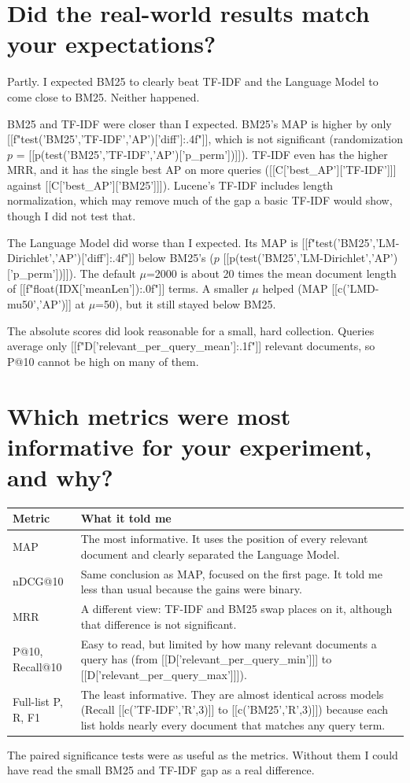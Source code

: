 \section{Did the real-world results match your expectations?}
Partly. I expected BM25 to clearly beat TF-IDF and the Language Model to come close to BM25. Neither happened.

BM25 and TF-IDF were closer than I expected. BM25's MAP is higher by only [[f"{test('BM25','TF-IDF','AP')['diff']:.4f}"]], which is not significant (randomization $p$ = [[p(test('BM25','TF-IDF','AP')['p_perm'])]]). TF-IDF even has the higher MRR, and it has the single best AP on more queries ([[C['best_AP']['TF-IDF']]] against [[C['best_AP']['BM25']]]). Lucene's TF-IDF includes length normalization, which may remove much of the gap a basic TF-IDF would show, though I did not test that.

The Language Model did worse than I expected. Its MAP is [[f"{test('BM25','LM-Dirichlet','AP')['diff']:.4f}"]] below BM25's ($p$ [[p(test('BM25','LM-Dirichlet','AP')['p_perm'])]]). The default $\mu$=2000 is about 20 times the mean document length of [[f"{float(IDX['meanLen']):.0f}"]] terms. A smaller $\mu$ helped (MAP [[c('LMD-mu50','AP')]] at $\mu$=50), but it still stayed below BM25.

The absolute scores did look reasonable for a small, hard collection. Queries average only [[f"{D['relevant_per_query_mean']:.1f}"]] relevant documents, so P@10 cannot be high on many of them.

\section{Which metrics were most informative for your experiment, and why?}
\begin{table}[H]\small\centering
\begin{tabularx}{\linewidth}{@{}lY@{}}\toprule
Metric & What it told me \\\midrule
MAP & The most informative. It uses the position of every relevant document and clearly separated the Language Model. \\
nDCG@10 & Same conclusion as MAP, focused on the first page. It told me less than usual because the gains were binary. \\
MRR & A different view: TF-IDF and BM25 swap places on it, although that difference is not significant. \\
P@10, Recall@10 & Easy to read, but limited by how many relevant documents a query has (from [[D['relevant_per_query_min']]] to [[D['relevant_per_query_max']]]). \\
Full-list P, R, F1 & The least informative. They are almost identical across models (Recall [[c('TF-IDF','R',3)]] to [[c('BM25','R',3)]]) because each list holds nearly every document that matches any query term. \\
\bottomrule\end{tabularx}\end{table}
The paired significance tests were as useful as the metrics. Without them I could have read the small BM25 and TF-IDF gap as a real difference.

